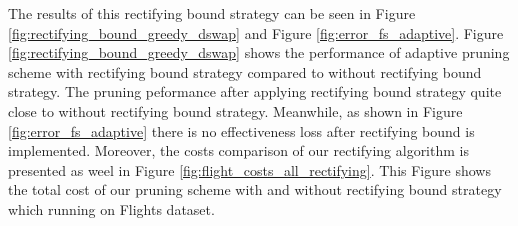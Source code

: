\documentclass{article}
\begin{document}
The results of this rectifying bound strategy can be seen in Figure \ref{fig:rectifying_bound_greedy_dswap} and Figure \ref{fig:error_fs_adaptive}. Figure \ref{fig:rectifying_bound_greedy_dswap} shows the performance of adaptive pruning scheme with rectifying bound strategy compared to without rectifying bound strategy. The pruning peformance after applying rectifying bound strategy quite close to without rectifying bound strategy. Meanwhile, as shown in Figure \ref{fig:error_fs_adaptive} there is no effectiveness loss after rectifying bound is implemented. Moreover, the costs comparison of our rectifying algorithm is presented as weel in Figure \ref{fig:flight_costs_all_rectifying}. This Figure shows the total cost of our pruning scheme with and without rectifying bound strategy which running on Flights dataset. 

%
%		



%		


\end{document}
